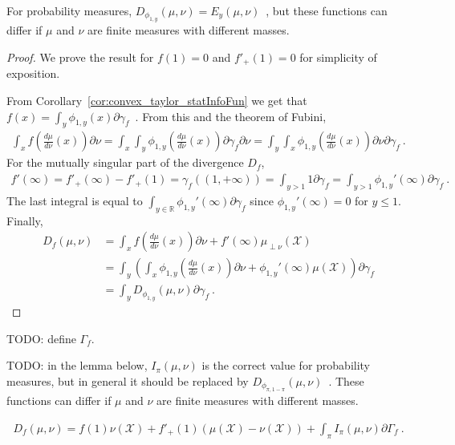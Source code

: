 For probability measures, $D_{\phi_{1,y}}(\mu, \nu) = E_y(\mu, \nu)$~, but these functions can differ if $\mu$ and $\nu$ are finite measures with different masses.

\begin{proof}%
{}
We prove the result for $f(1) = 0$ and $f'_+(1) = 0$ for simplicity of exposition.

From Corollary~\ref{cor:convex_taylor_statInfoFun} we get that $f(x) = \int_y \phi_{1,y}(x) \partial\gamma_f$~.
From this and the theorem of Fubini,
\begin{align*}
\int_x f\left( \frac{d \mu}{d \nu}(x) \right) \partial\nu
= \int_{x} \int_{y} \phi_{1,y} \left(\frac{d \mu}{d \nu}(x) \right) \partial\gamma_f \partial\nu
= \int_{y} \int_{x} \phi_{1,y} \left(\frac{d \mu}{d \nu}(x) \right) \partial\nu \partial\gamma_f
\: .
\end{align*}
For the mutually singular part of the divergence $D_f$,
\begin{align*}
f'(\infty)
= f'_+(\infty) - f'_+(1) 
= \gamma_f((1,+\infty))
= \int_{y > 1} 1 \partial \gamma_f
= \int_{y > 1} \phi_{1,y}'(\infty) \partial \gamma_f
\: .
\end{align*}
The last integral is equal to $\int_{y \in \mathbb{R}} \phi_{1,y}'(\infty) \partial \gamma_f$ since $\phi_{1,y}'(\infty) = 0$ for $y \le 1$.
Finally,
\begin{align*}
D_f(\mu, \nu)
&= \int_x f\left( \frac{d \mu}{d \nu}(x) \right) \partial\nu + f'(\infty) \mu_{\perp \nu}(\mathcal X)
\\
&= \int_{y} \left(\int_{x} \phi_{1,y} \left(\frac{d \mu}{d \nu}(x) \right) \partial\nu + \phi_{1,y}'(\infty) \mu(\mathcal X) \right) \partial\gamma_f
\\
&= \int_y D_{\phi_{1,y}}(\mu, \nu) \partial \gamma_f
\: .
\end{align*}
\end{proof}

TODO: define $\Gamma_f$.

TODO: in the lemma below, $I_\pi(\mu, \nu)$ is the correct value for probability measures, but in general it should be replaced by $D_{\phi_{\pi, 1 - \pi}}(\mu, \nu)$~.
These functions can differ if $\mu$ and $\nu$ are finite measures with different masses.

\begin{theorem}
  \label{thm:fDiv_eq_integral}
  \begin{align*}
  D_f(\mu, \nu) = f(1) \nu(\mathcal X) + f'_+(1)(\mu(\mathcal X) - \nu(\mathcal X)) + \int_\pi I_\pi(\mu, \nu) \partial\Gamma_f \: .
  \end{align*}
  
\end{theorem}

